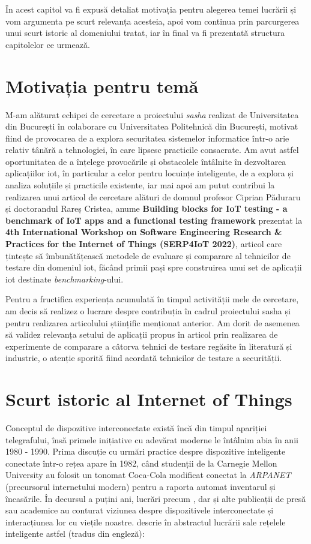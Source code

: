 În acest capitol va fi expusă detaliat motivația pentru alegerea temei lucrării și vom argumenta pe scurt relevanța acesteia, apoi vom continua prin parcurgerea unui scurt istoric al domeniului tratat, iar în final va fi prezentată structura capitolelor ce urmează.

\section{Motivația pentru temă}

M-am alăturat echipei de cercetare a proiectului \textit{\acrfull{sasha}} realizat de Universitatea din București în colaborare cu Universitatea Politehnică din București, motivat fiind de provocarea de a explora securitatea sistemelor informatice într-o arie relativ tânără a tehnologiei, în care lipsesc practicile consacrate. Am avut astfel oportunitatea de a înțelege provocările și obstacolele întâlnite în dezvoltarea aplicațiilor \acrshort{iot}, în particular a celor pentru locuințe inteligente, de a explora și analiza soluțiile și practicile existente, iar mai apoi am putut contribui la realizarea unui articol de cercetare alături de domnul profesor Ciprian Păduraru și doctorandul Rareș Cristea, anume \textbf{Building blocks for IoT testing - a benchmark of IoT apps and a functional testing framework} prezentat la \textbf{4th International Workshop on Software Engineering Research \& Practices for the Internet of Things (SERP4IoT 2022)}, articol care țintește să îmbunătățească metodele de evaluare și comparare al tehnicilor de testare din domeniul \acrlong{iot}, făcând primii pași spre construirea unui set de aplicații \acrshort{iot} destinate \textit{benchmarking}-ului.

Pentru a fructifica experiența acumulată în timpul activității mele de cercetare, am decis să realizez o lucrare despre contribuția în cadrul proiectului \acrshort{sasha} și pentru realizarea articolului științific menționat anterior. Am dorit de asemenea să validez relevanța setului de aplicații propus în articol prin realizarea de experimente de comparare a câtorva tehnici de testare regăsite în literatură și industrie, o atenție sporită fiind acordată tehnicilor de testare a securității.

\section{Scurt istoric al Internet of Things}

Conceptul de dispozitive interconectate există încă din timpul apariției telegrafului, însă primele inițiative cu adevărat moderne le întâlnim abia în anii 1980 - 1990. Prima discuție cu urmări practice despre dispozitive inteligente conectate într-o rețea apare în 1982, când studenții de la  Carnegie Mellon University au folosit un tonomat Coca-Cola modificat conectat la \textit{ARPANET} (precursorul internetului modern) pentru a raporta automat inventarul și încasările. În decursul a puțini ani, lucrări precum \citet{Weiser1999}, dar și alte publicații de presă sau academice au conturat viziunea despre dispozitivele interconectate și interacțiunea lor cu viețile noastre. \citet{Raji1994} descrie în abstractul lucrării sale rețelele inteligente astfel (tradus din engleză):

